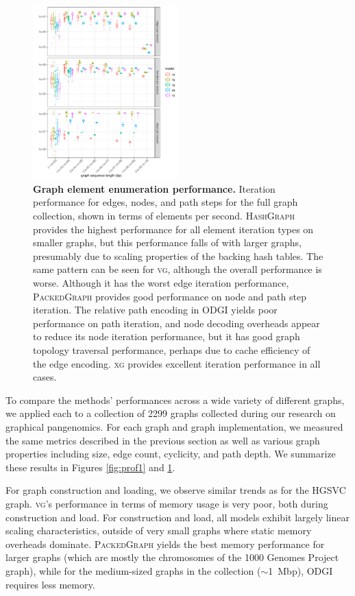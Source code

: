 \documentclass{bioinfo}
\begin{document}
\begin{figure}
  \centering
  \includegraphics[width=0.5\textwidth]{figures/iteration_per_second_boxplot.pdf}
  \caption{
    \label{fig:prof2}
    \textbf{Graph element enumeration performance.}
    Iteration performance for edges, nodes, and path steps for the full graph collection, shown in terms of elements per second.
    \textsc{HashGraph} provides the highest performance for all element iteration types on smaller graphs, but this performance falls of with larger graphs, presumably due to scaling properties of the backing hash tables.
    The same pattern can be seen for \textsc{vg}, although the overall performance is worse.
    Although it has the worst edge iteration performance, \textsc{PackedGraph} provides good performance on node and path step iteration.
    The relative path encoding in \textsc{ODGI} yields poor performance on path iteration, and node decoding overheads appear to reduce its node iteration performance, but it has good graph topology traversal performance, perhaps due to cache efficiency of the edge encoding.
    \textsc{xg} provides excellent iteration performance in all cases.
    }
\end{figure}

To compare the methods' performances across a wide variety of different graphs, we applied each to a collection of 2299 graphs collected during our research on graphical pangenomics.
For each graph and graph implementation, we measured the same metrics described in the previous section as well as various graph properties including size, edge count, cyclicity, and path depth.
We summarize these results in Figures \ref{fig:prof1} and \ref{fig:prof2}.

For graph construction and loading, we observe similar trends as for the HGSVC graph.
\textsc{vg}'s performance in terms of memory usage is very poor, both during construction and load.
For construction and load, all models exhibit largely linear scaling characteristics, outside of very small graphs where static memory overheads dominate.
\textsc{PackedGraph} yields the best memory performance for larger graphs (which are mostly the chromosomes of the 1000 Genomes Project graph), while for the medium-sized graphs in the collection ($\sim$1~Mbp), \textsc{ODGI} requires less memory.
\end{document}
